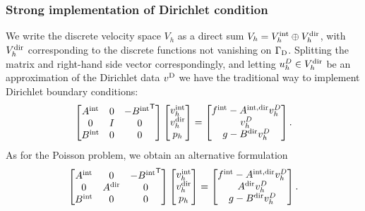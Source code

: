 \subsubsection{Strong implementation of Dirichlet condition}
%
We write the discrete velocity space $V_h$ as a direct sum $V_h = {V}^{\rm int}_h \oplus {V}^{\rm dir}_h$, with ${V}^{\rm dir}_h$ corresponding to the discrete functions not vanishing on $\Gamma_{\rm D}$. 
Splitting the matrix and right-hand side vector correspondingly, and letting $u^D_h\in {V}^{\rm dir}_h$ be an approximation of the Dirichlet data $v^{\rm D}$ we have the traditional way to implement Dirichlet boundary conditions:
%
\begin{equation}\label{eq:StokesDirTrad}
\begin{bmatrix}
{A}^{\rm int} & 0 & -{{B}^{\rm int}}^{\mathsf{T}}\\
0 & I & 0 \\
{B}^{\rm int} & 0 & 0
\end{bmatrix}
\begin{bmatrix}
{v}^{\rm int}_h\\
{v}^{\rm dir}_h\\
p_h
\end{bmatrix}
=
\begin{bmatrix}
{f}^{\rm int} - {A}^{\rm int, dir} v^D_h\\
v^D_h\\
g - {B}^{\rm dir} v^D_h
\end{bmatrix}.
\end{equation}
%
As for the Poisson problem, we obtain an alternative formulation   
%
\begin{equation}\label{eq:StokesDirNew}
\begin{bmatrix}
{A}^{\rm int} & 0 & -{{B}^{\rm int}}^{\mathsf{T}}\\
0 & {A}^{\rm dir} & 0 \\
{B}^{\rm int} & 0 & 0
\end{bmatrix}
\begin{bmatrix}
{v}^{\rm int}_h\\
{v}^{\rm dir}_h\\
p_h
\end{bmatrix}
=
\begin{bmatrix}
{f}^{\rm int} - {A}^{\rm int, dir} v^D_h\\
{A}^{\rm dir} v^D_h\\
g - {B}^{\rm dir} v^D_h
\end{bmatrix}.
\end{equation}
%
%
